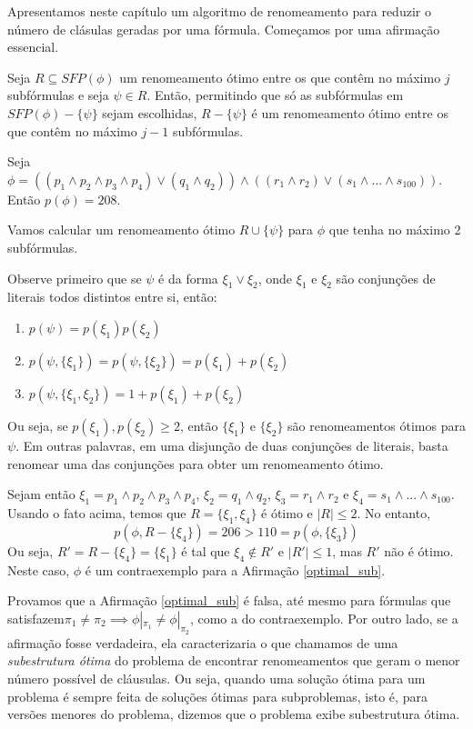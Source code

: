 
\label{cap_algoritmo}

\indent

Apresentamos neste capítulo um algoritmo de renomeamento para reduzir o número de clásulas geradas por uma fórmula. Começamos por uma afirmação essencial.

\begin{affirmation}
	\label{optimal_sub}
	Seja $R \subseteq SFP(\phi)$ um renomeamento ótimo entre os que contêm no máximo $j$ subfórmulas e seja $\psi \in R$. Então, permitindo que só as subfórmulas em $SFP(\phi) - \{\psi \}$ sejam escolhidas, $R - \{\psi\}$ é um renomeamento ótimo entre os que contêm no máximo $j-1$ subfórmulas.
\end{affirmation}

\begin{prova}
Seja $\phi = ((p_1 \wedge p_2 \wedge p_3 \wedge p_4) \vee (q_1 \wedge q_2)) \wedge ((r_1 \wedge r_2) \vee (s_1 \wedge ... \wedge s_{100}))$. Então $p(\phi) = 208$.

Vamos calcular um renomeamento ótimo $R \cup \{\psi \}$ para $\phi$ que tenha no máximo 2 subfórmulas.

Observe primeiro que se $\psi$ é da forma $\xi_1 \vee \xi_2$, onde $\xi_1$ e $\xi_2$ são conjunções de literais todos distintos entre si, então:
\begin{enumerate}
	\item $p(\psi) = p(\xi_1)p(\xi_2)$
	\item $p(\psi, \{\xi_1 \}) = p(\psi, \{\xi_2 \}) = p(\xi_1)+p(\xi_2)$
	\item $p(\psi,\{\xi_1,\xi_2 \}) = 1+p(\xi_1)+p(\xi_2)$
\end{enumerate}
Ou seja, se $p(\xi_1),p(\xi_2) \geq 2$, então $\{\xi_1 \}$ e $\{\xi_2 \}$ são renomeamentos ótimos para $\psi$. Em outras palavras, em uma disjunção de duas conjunções de literais, basta renomear uma das conjunções para obter um renomeamento ótimo.

Sejam então $\xi_1 = p_1 \wedge p_2 \wedge p_3 \wedge p_4$, $\xi_2 = q_1 \wedge q_2$, $\xi_3 = r_1 \wedge r_2$ e $\xi_4 = s_1 \wedge ... \wedge s_{100}$. Usando o fato acima, temos que $R = \{\xi_1,\xi_4 \}$ é ótimo e $|R| \leq 2$. No entanto, $$p(\phi,R - \{\xi_4 \}) = 206 > 110 = p(\phi,\{\xi_3 \})$$ Ou seja, $R' = R - \{\xi_4 \} = \{\xi_1 \}$ é tal que $\xi_4 \notin R'$ e $|R'| \leq 1$, mas $R'$ não é ótimo. Neste caso, $\phi$ é um contraexemplo para a Afirmação \ref{optimal_sub}.
\end{prova}

Provamos que a Afirmação \ref{optimal_sub} é falsa, até mesmo para fórmulas que satisfazem\break $\pi_1 \neq \pi_2 \implies \phi|_{\pi_1} \neq \phi|_{\pi_2}$, como a do contraexemplo. Por outro lado, se a afirmação fosse verdadeira, ela caracterizaria o que chamamos de uma \emph{subestrutura ótima} do problema de encontrar renomeamentos que geram o menor número possível de cláusulas. Ou seja, quando uma solução ótima para um problema é sempre feita de soluções ótimas para subproblemas, isto é, para versões menores do problema, dizemos que o problema exibe subestrutura ótima.

